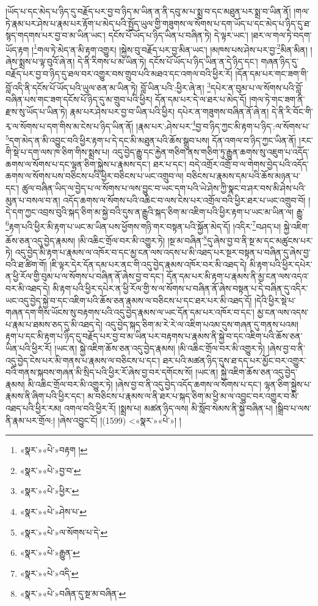 །ཡོད་པ་དང་མེད་པ་ཉིད་དུ་བརྗོད་པར་བྱ་བ་ཉིད་མ་ཡིན་ན་ནི་དབུ་མ་པ་སྨྲ་བ་དང་མཐུན་པར་སྨྲ་བ་ཡིན་ནོ། །གལ་ཏེ་རྣམ་པར་ཤེས་པ་རྣམ་པར་རྟོག་པ་མེད་པའི་སྤྱོད་ཡུལ་གྱི་གཟུགས་ལ་སོགས་པ་དག་ཡོད་པ་དང་མེད་པ་ཉིད་དུ་ཐ་སྙད་གདགས་པར་བྱ་བ་མ་ཡིན་ཡང་། དངོས་པོ་ཡོད་པ་ཉིད་ཡིན་པ་བཞིན་ཏེ། དེ་ལྟར་ཡང་། །ཐར་ལ་གལ་ཏེ་བདག་ཡོད་རྟག །\footnote{«སྣར་»«པེ་»བརྟག །}གལ་ཏེ་མེད་ན་མི་རྟག་འགྱུར། །སྐྱེས་བུ་བརྗོད་པར་བྱ་མིན་ཡང་། །མཁས་པས་ཤེས་པར་བྱ་\footnote{«སྣར་»«པེ་»བྱ་བ་}མིན་མིན། །ཞེས་སྨྲས་པ་ལྟ་བུའོ་ཞེ་ན། དེ་ནི་རིགས་པ་མ་ཡིན་ཏེ། དངོས་པོ་ཡོད་པ་ཉིད་ཡིན་ན་དེ་ཉིད་དང་། གཞན་ཉིད་དུ་བརྗོད་པར་བྱ་བ་ཉིད་དུ་ཐལ་བར་འགྱུར་བས་གྲུབ་པའི་མཐའ་དང་འགལ་བའི་ཕྱིར་རོ། །དོན་དམ་པར་གང་ཟག་གི་བློ་འདི་ནི་དངོས་པོ་ཡོད་པའི་ཡུལ་ཅན་མ་ཡིན་ཏེ། བློ་ཡིན་པའི་:ཕྱིར་ཞེ་ན། \footnote{«སྣར་»«པེ་»ཕྱིར་}དཔེར་ན་བུམ་པ་ལ་སོགས་པའི་བློ་བཞིན་པས་གང་ཟག་དངོས་པོ་ཉིད་དུ་མ་གྲུབ་པའི་ཕྱིར། དོན་དམ་པར་དེ་ལ་ཐར་པ་མེད་དོ། །གལ་ཏེ་གང་ཟག་ནི་རྫས་སུ་ཡོད་པ་ཡིན་ཏེ། རྣམ་པར་ཤེས་པར་བྱ་བ་ཡིན་པའི་ཕྱིར། དཔེར་ན་གཟུགས་བཞིན་ནོ་ཞེ་ན། དེ་ནི་རི་བོང་གི་རྭ་ལ་སོགས་པ་དག་གིས་མ་ངེས་པ་ཉིད་ཡིན་ནོ། །རྣམ་པར་:ཤེས་པར་\footnote{«སྣར་»«པེ་»ཤེས་པ་}བྱ་བ་ཉིད་ཀྱང་མི་རྟག་པ་ཉིད་:ལ་སོགས་པ་\footnote{«སྣར་»«པེ་»ལ་སོགས་པ་དེ་}དག་མེད་ན་མི་འབྱུང་བའི་ཕྱིར་རྟག་པ་དེ་དང་མི་མཐུན་པའི་ཆོས་སྒྲུབ་པས། དོན་འགལ་བ་ཉིད་ཀྱང་ཡིན་ནོ། །རང་གི་སྡེ་པ་དག་ལས་ཁ་ཅིག་གིས་སྨྲས་པ། འདུ་བྱེད་རྒྱུ་དང་རྐྱེན་གཅིག་ནས་གཅིག་ཏུ་རྒྱུན་ཆགས་སུ་འཇུག་པ་འདོད་ཆགས་ལ་སོགས་པ་དང་ལྷན་ཅིག་སྐྱེས་པ་རྣམས་དང་། ཐར་པ་དང་། བདེ་འགྲོར་འགྲོ་བ་ལ་གེགས་བྱེད་པའི་འདོད་ཆགས་ལ་སོགས་པས་བཅིངས་པའི་ཕྱིར་བཅིངས་པ་ཡང་འགྲུབ་ལ། བཅིངས་པ་རྣམས་དམ་པའི་ཆོས་མཉན་པ་དང་། ཚུལ་བཞིན་ཡིད་ལ་བྱེད་པ་ལ་སོགས་པ་ལས་བྱུང་བ་ཡང་དག་པའི་ཡེ་ཤེས་ཀྱི་སྣང་བ་ཤར་བས་མི་ཤེས་པའི་མུན་པ་བསལ་བ་ན། འདོད་ཆགས་ལ་སོགས་པའི་འཆིང་བ་ལས་ངེས་པར་འགྲོལ་བའི་ཕྱིར་ཐར་པ་ཡང་འགྲུབ་བོ། །དེ་དག་ཀྱང་འབྲས་བུའི་སྐད་ཅིག་མ་སྐྱེ་བའི་དུས་ན་རྒྱུའི་སྐད་ཅིག་མ་འཇིག་པའི་ཕྱིར་རྟག་པ་ཡང་མ་ཡིན་ལ། རྒྱུ་\footnote{«སྣར་»«པེ་»རྒྱུན་}རྟག་པའི་ཕྱིར་མི་རྟག་པ་ཡང་མ་ཡིན་པས་ཕྱོགས་གཉི་གར་བསྟན་པའི་སྐྱོན་མེད་དོ། །འདིར་\footnote{«སྣར་»«པེ་»འདི་}བཤད་པ། སྐྱེ་འཇིག་ཆོས་ཅན་འདུ་བྱེད་རྣམས། །མི་འཆིང་གྲོལ་བར་མི་འགྱུར་ཏེ། །སྔ་མ་བཞིན་\footnote{«སྣར་»«པེ་»བཞིན་དུ་སྔ་མ་བཞིན་}དུ་ཞེས་བྱ་བ་ནི་སྔ་མ་དང་མཚུངས་པར་ཏེ། འདུ་བྱེད་མི་རྟག་པ་རྣམས་ལ་འཁོར་བ་དང་མྱ་ངན་ལས་འདས་པ་མི་འཐད་པར་སྔར་བསྟན་པ་བཞིན་དུ་ཞེས་བྱ་བའི་ཐ་ཚིག་གོ། །ཇི་ལྟར་དེར་དོན་དམ་པར་ནང་གི་འདུ་བྱེད་རྣམས་འཁོར་བར་མི་འཐད་དེ། མི་རྟག་པའི་ཕྱིར་དཔེར་ན་ཕྱི་རོལ་གྱི་བུམ་པ་ལ་སོགས་པ་བཞིན་ནོ་ཞེས་བྱ་བ་དང་། དོན་དམ་པར་མི་རྟག་པ་རྣམས་ནི་མྱ་ངན་ལས་འདའ་བར་མི་འཐད་དེ། མི་རྟག་པའི་ཕྱིར་དཔེར་ན་ཕྱི་རོལ་གྱི་ས་ལ་སོགས་པ་བཞིན་ནོ་ཞེས་བསྟན་པ་དེ་བཞིན་དུ་འདིར་ཡང་འདུ་བྱེད་སྐྱེ་བ་དང་འཇིག་པའི་ཆོས་ཅན་རྣམས་ལ་བཅིངས་པ་དང་ཐར་པར་མི་འཐད་དོ། །དེའི་ཕྱིར་སྡེ་པ་གཞན་དག་གིས་ཡོངས་སུ་བརྟགས་པའི་འདུ་བྱེད་རྣམས་ལ་ཡང་དོན་དམ་པར་འཁོར་བ་དང་། མྱ་ངན་ལས་འདས་པ་རྣམ་པ་ཐམས་ཅད་དུ་མི་འཐད་དེ། འདུ་བྱེད་སྐད་ཅིག་མ་རེ་རེ་ལ་འཇིག་པའམ་དུས་གཞན་དུ་གནས་པའམ། རྟག་པ་དང་མི་རྟག་པ་ཉིད་དུ་བརྗོད་པར་བྱ་བ་མ་ཡིན་པར་བརྟགས་པ་རྣམས་ནི་སྐྱེ་བ་དང་འཇིག་པའི་ཆོས་ཅན་ཡིན་པའི་ཕྱིར་རོ། །ཡང་ན། སྐྱེ་འཇིག་ཆོས་ཅན་འདུ་བྱེད་རྣམས། །མི་འཆིང་གྲོལ་བར་མི་འགྱུར་ཏེ། །ཞེས་བྱ་བ་ནི་འདུ་བྱེད་ངེས་པར་མི་གནས་པ་རྣམས་ལ་བཅིངས་པ་དང་། ཐར་པའི་མཚན་ཉིད་དུས་ཐ་དད་པར་མྱོང་བར་འགྱུར་བའི་གནས་སྐབས་གཞན་མི་སྲིད་པའི་ཕྱིར་རོ་ཞེས་བྱ་བར་དགོངས་སོ། །ཡང་ན། སྐྱེ་འཇིག་ཆོས་ཅན་འདུ་བྱེད་རྣམས། མི་འཆིང་གྲོལ་བར་མི་འགྱུར་ཏེ། །ཞེས་བྱ་བ་ནི་འདུ་བྱེད་འདོད་ཆགས་ལ་སོགས་པ་དང་། ལྷན་ཅིག་སྐྱེས་པ་རྣམས་ནི་ཞིག་པའི་ཕྱིར་དང་། མ་བཅིངས་པ་རྣམས་ལ་ནི་ཐར་པ་སྐད་ཅིག་མ་ཕྱི་མ་ལ་འབྱུང་བར་འགྱུར་བ་མི་འཐད་པའི་ཕྱིར་རམ། འགལ་བའི་ཕྱིར་རོ། །སྨྲས་པ། མཚན་ཉིད་ལས། མི་སློབ་སེམས་ནི་སྐྱེ་བཞིན་པ། །སྒྲིབ་པ་ལས་ནི་རྣམ་པར་གྲོལ:། །ཞེས་འབྱུང་ངོ། །(1599) <«སྣར་»«པེ་»། །
